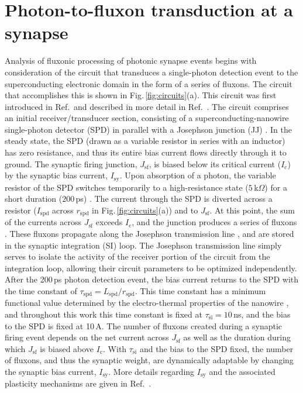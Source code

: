 \documentclass[twocolumn]{article}
\newcommand{\onlinecite}[1]{\hspace{-1 ex} \nocite{#1}\citenum{#1}}
\begin{document}
\section{\label{sec:synapse}Photon-to-fluxon transduction at a synapse}
Analysis of fluxonic processing of photonic synapse events begins with consideration of the circuit that transduces a single-photon detection event to the superconducting electronic domain in the form of a series of fluxons. The circuit that accomplishes this is shown in Fig.\,\ref{fig:circuits}(a). This circuit was first introduced in Ref.\,\onlinecite{sh2018} and described in more detail in Ref.\,\onlinecite{sh2018_full}. The circuit comprises an initial receiver/transducer section, consisting of a superconducting-nanowire single-photon detector (SPD) \cite{gook2001,nata2012,liyo2013,mave2013} in parallel with a Josephson junction (JJ) \cite{ti1996,vatu1998,ka1999}. In the steady state, the SPD (drawn as a variable resistor in series with an inductor) has zero resistance, and thus its entire bias current flows directly through it to ground. The synaptic firing junction, $J_{\mathrm{sf}}$, is biased below its critical current ($I_{\mathrm{c}}$) by the synaptic bias current, $I_{\mathrm{sy}}$. Upon absorption of a photon, the variable resistor of the SPD switches temporarily to a high-resistance state ($5$\,k$\Omega$) for a short duration ($200$\,ps) \cite{yake2007}. The current through the SPD is diverted across a resistor ($I_{\mathrm{spd}}$ across $r_{\mathrm{spd}}$ in Fig.\,\ref{fig:circuits}(a)) and to $J_{\mathrm{sf}}$. At this point, the sum of the currents across $J_{\mathrm{sf}}$ exceeds $I_{\mathrm{c}}$, and the junction produces a series of fluxons \cite{ti1996,vatu1998,ka1999}. These fluxons propagate along the Josephson transmission line \cite{vatu1998,ka1999}, and are stored in the synaptic integration (SI) loop. The Josephson transmission line simply serves to isolate the activity of the receiver portion of the circuit from the integration loop, allowing their circuit parameters to be optimized independently. After the 200\,ps photon detection event, the bias current returns to the SPD with the time constant of $\tau_{\mathrm{spd}} = L_{\mathrm{spd}}/r_{\mathrm{spd}}$. This time constant has a minimum functional value determined by the electro-thermal properties of the nanowire \cite{yake2007}, and throughout this work this time constant is fixed at $\tau_{\mathrm{si}} = 10$\,ns, and the bias to the SPD is fixed at 10\,\textmu A. The number of fluxons created during a synaptic firing event depends on the net current across $J_{\mathrm{sf}}$ as well as the duration during which $J_{\mathrm{sf}}$ is biased above $I_{\mathrm{c}}$. With $\tau_{\mathrm{si}}$ and the bias to the SPD fixed, the number of fluxons, and thus the synaptic weight, are dynamically adaptable by changing the synaptic bias current, $I_{\mathrm{sy}}$. More details regarding $I_{\mathrm{sy}}$ and the associated plasticity mechanisms are given in Ref.\,\onlinecite{sh2018_full}.
 
\end{document}
